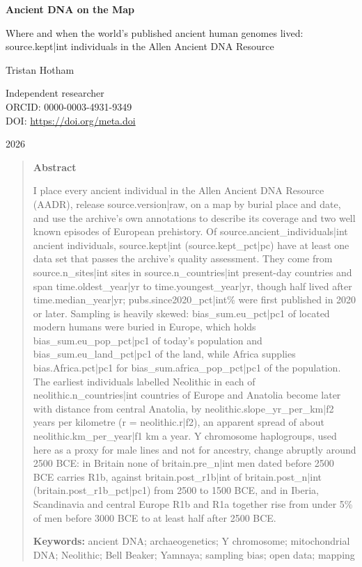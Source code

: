 \documentclass[11pt,a4paper]{article}
\begin{document}
\begin{center}
{\Large\bfseries Ancient DNA on the Map\par}
\vspace{0.4em}
{\large Where and when the world's published ancient human genomes lived:\\{{source.kept|int}} individuals in the Allen Ancient DNA Resource\par}
\vspace{1.2em}
{\large Tristan Hotham\par}
\vspace{0.3em}
{\small Independent researcher\\
ORCID: 0000-0003-4931-9349\\
DOI: \href{https://doi.org/{{meta.doi}}}{https://doi.org/{{meta.doi}}}\par}
\vspace{0.8em}
2026
\end{center}

\begin{quote}
\small
\begin{center}\textbf{Abstract}\end{center}
I place every ancient individual in the Allen Ancient DNA Resource (AADR), release {{source.version|raw}}, on a map by burial place and date, and use the archive's own annotations to describe its coverage and two well known episodes of European prehistory. Of {{source.ancient_individuals|int}} ancient individuals, {{source.kept|int}} ({{source.kept_pct|pc}}) have at least one data set that passes the archive's quality assessment. They come from {{source.n_sites|int}} sites in {{source.n_countries|int}} present-day countries and span {{time.oldest_year|yr}} to {{time.youngest_year|yr}}, though half lived after {{time.median_year|yr}}; {{pubs.since2020_pct|int}}\% were first published in 2020 or later. Sampling is heavily skewed: {{bias_sum.eu_pct|pc1}} of located modern humans were buried in Europe, which holds {{bias_sum.eu_pop_pct|pc1}} of today's population and {{bias_sum.eu_land_pct|pc1}} of the land, while Africa supplies {{bias.Africa.pct|pc1}} for {{bias_sum.africa_pop_pct|pc1}} of the population. The earliest individuals labelled Neolithic in each of {{neolithic.n_countries|int}} countries of Europe and Anatolia become later with distance from central Anatolia, by {{neolithic.slope_yr_per_km|f2}} years per kilometre (r = {{neolithic.r|f2}}), an apparent spread of about {{neolithic.km_per_year|f1}} km a year. Y chromosome haplogroups, used here as a proxy for male lines and not for ancestry, change abruptly around 2500 BCE: in Britain none of {{britain.pre_n|int}} men dated before 2500 BCE carries R1b, against {{britain.post_r1b|int}} of {{britain.post_n|int}} ({{britain.post_r1b_pct|pc1}}) from 2500 to 1500 BCE, and in Iberia, Scandinavia and central Europe R1b and R1a together rise from under 5\% of men before 3000 BCE to at least half after 2500 BCE.

\textbf{Keywords:} ancient DNA; archaeogenetics; Y chromosome; mitochondrial DNA; Neolithic; Bell Beaker; Yamnaya; sampling bias; open data; mapping
\end{quote}
\end{document}
